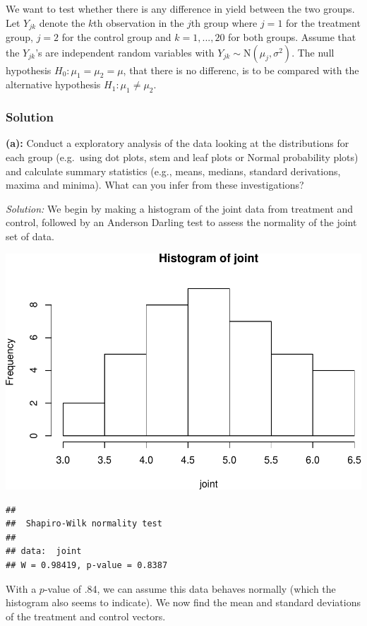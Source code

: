 \documentclass[]{article}
\begin{document}
We want to test whether there is any difference in yield between the two
groups. Let \(Y_{jk}\) denote the \(k\)th observation in the \(j\)th
group where \(j = 1\) for the treatment group, \(j = 2\) for the control
group and \(k = 1,...,20\) for both groups. Assume that the \(Y_{jk}\)'s
are independent random variables with
\(Y_{jk} \sim \text{N}(\mu_j, \sigma^2)\). The null hypothesis
\(H_0: \mu_1 = \mu_2 = \mu\), that there is no differenc, is to be
compared with the alternative hypothesis \(H_1 : \mu_1 \neq \mu_2\).

\subsubsection{Solution}\label{solution}

\textbf{(a):} Conduct a exploratory analysis of the data looking at the
distributions for each group (e.g.~using dot plots, stem and leaf plots
or Normal probability plots) and calculate summary statistics (e.g.,
means, medians, standard derivations, maxima and minima). What can you
infer from these investigations?

\emph{Solution: } We begin by making a histogram of the joint data from
treatment and control, followed by an Anderson Darling test to assess
the normality of the joint set of data.

\includegraphics{ExercisesWithSolutions_files/figure-latex/unnamed-chunk-2-1.pdf}

\begin{verbatim}
## 
##  Shapiro-Wilk normality test
## 
## data:  joint
## W = 0.98419, p-value = 0.8387
\end{verbatim}

With a \(p\)-value of .84, we can assume this data behaves normally
(which the histogram also seems to indicate). We now find the mean and
standard deviations of the treatment and control vectors.
\end{document}
